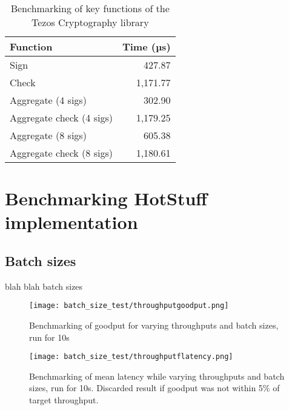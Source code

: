 \begin{table}[!h]
	\centering
	\begin{tabular}{|l|r|}
	\hline
	Function                 & Time (µs) \\ \hline
	Sign                     & 427.87   \\
	Check                    & 1,171.77 \\
	Aggregate (4 sigs)       & 302.90   \\
	Aggregate check (4 sigs) & 1,179.25 \\
	Aggregate (8 sigs)       & 605.38   \\
	Aggregate check (8 sigs) & 1,180.61 \\ \hline
	\end{tabular}
	\caption{Benchmarking of key functions of the Tezos Cryptography library}
\end{table}

\section{Benchmarking HotStuff implementation}
\subsection{Batch sizes}
blah blah batch sizes

\begin{figure}[h!]
\centering
\texttt{[image: batch\_size\_test/throughputgoodput.png]}
\caption{Benchmarking of goodput for varying throughputs and batch sizes, run for 10s}
\end{figure}

\begin{figure}[h!]
\centering
\texttt{[image: batch\_size\_test/throughputflatency.png]}
\caption{Benchmarking of mean latency while varying throughputs and batch sizes, run for 10s. Discarded result if goodput was not within 5\% of target throughput.}
\end{figure}


